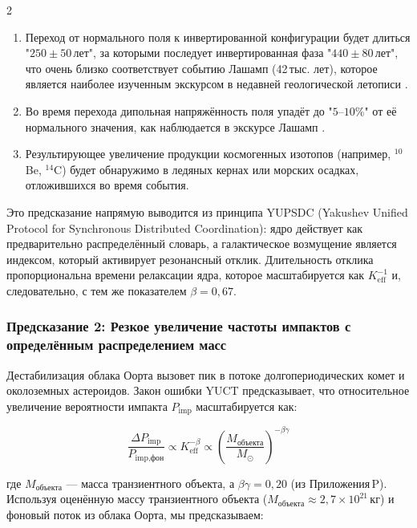 \documentclass[11pt,a4paper]{article}
\begin{document}
\begin{multicols}{2}
		\begin{enumerate}
			\item Переход от нормального поля к инвертированной конфигурации
			будет длиться "\(250 \pm 50\) лет", за которыми последует инвертированная фаза
			"\(440 \pm 80\) лет", что очень близко соответствует событию Лашамп
			(42 тыс. лет), которое является наиболее изученным экскурсом в недавней геологической
			летописи \cite{Laschamp}.
			\item Во время перехода дипольная напряжённость поля упадёт до
			"\(5\)–\(10\%\)" от её нормального значения, как наблюдается в экскурсе Лашамп \cite{Laschamp}.
			\item Результирующее увеличение продукции космогенных изотопов
			(например, \(^{10}\)Be, \(^{14}\)C) будет обнаружимо в ледяных кернах или
			морских осадках, отложившихся во время события.
		\end{enumerate}
		
		Это предсказание напрямую выводится из принципа YUPSDC (Yakushev Unified Protocol for Synchronous Distributed Coordination): ядро действует как предварительно распределённый словарь, а галактическое возмущение является индексом, который активирует резонансный отклик. Длительность отклика пропорциональна времени релаксации ядра, которое масштабируется как \(K_{\mathrm{eff}}^{-1}\) и, следовательно, с тем же показателем \(\beta=0,67\).
		
		\subsubsection{Предсказание 2: Резкое увеличение частоты импактов с определённым распределением масс}
		
		Дестабилизация облака Оорта вызовет пик в потоке долгопериодических
		комет и околоземных астероидов. Закон ошибки YUCT предсказывает, что
		относительное увеличение вероятности импакта \(P_{\text{imp}}\) масштабируется как:
		
		\[
		\frac{\Delta P_{\text{imp}}}{P_{\text{imp,фон}}} \propto K_{\mathrm{eff}}^{-\beta} \propto \left(\frac{M_{\text{объекта}}}{M_{\odot}}\right)^{-\beta\gamma}
		\]
		
		где \(M_{\text{объекта}}\) — масса транзиентного объекта, а
		\(\beta\gamma = 0,20\) (из Приложения P). Используя оценённую массу
		транзиентного объекта (\(M_{\text{объекта}} \approx 2,7\times10^{21}\) кг) и
		фоновый поток из облака Оорта, мы предсказываем:
		

\end{multicols}
\end{document}
